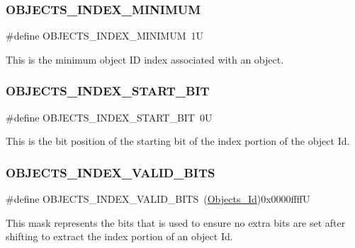 \subsubsection{\texorpdfstring{OBJECTS\_INDEX\_MINIMUM}{OBJECTS\_INDEX\_MINIMUM}}
{\footnotesize\ttfamily \#define O\+B\+J\+E\+C\+T\+S\+\_\+\+I\+N\+D\+E\+X\+\_\+\+M\+I\+N\+I\+M\+UM~1U}

This is the minimum object ID index associated with an object. \mbox{\label{group__RTEMSScoreObject_ga7cc4de103f4de9f42b4a89eb505ad1f5}} 
\subsubsection{\texorpdfstring{OBJECTS\_INDEX\_START\_BIT}{OBJECTS\_INDEX\_START\_BIT}}
{\footnotesize\ttfamily \#define O\+B\+J\+E\+C\+T\+S\+\_\+\+I\+N\+D\+E\+X\+\_\+\+S\+T\+A\+R\+T\+\_\+\+B\+IT~0U}

This is the bit position of the starting bit of the index portion of the object Id. \mbox{\label{group__RTEMSScoreObject_ga9c66cd897ef03bfe06abdf0c3b6d4f36}} 
\subsubsection{\texorpdfstring{OBJECTS\_INDEX\_VALID\_BITS}{OBJECTS\_INDEX\_VALID\_BITS}}
{\footnotesize\ttfamily \#define O\+B\+J\+E\+C\+T\+S\+\_\+\+I\+N\+D\+E\+X\+\_\+\+V\+A\+L\+I\+D\+\_\+\+B\+I\+TS~(\mbox{\hyperlink{group__RTEMSScoreObject_ga5821f52a51072941bdd603e542d0863e}{Objects\+\_\+\+Id}})0x0000ffffU}

This mask represents the bits that is used to ensure no extra bits are set after shifting to extract the index portion of an object Id. \mbox{\label{group__RTEMSScoreObject_gac485289406e4297a576a74f72a28f608}} 
